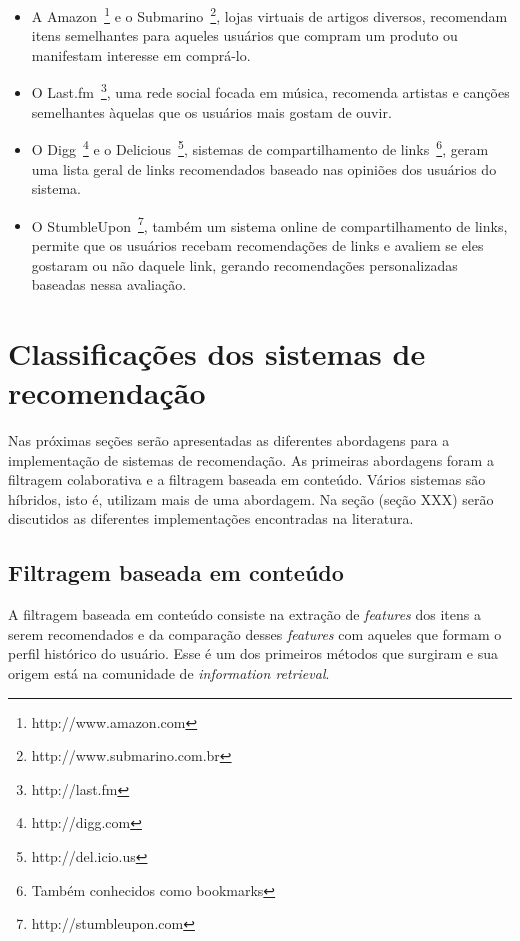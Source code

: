 \begin{itemize}
\item 
A Amazon~\footnote{http://www.amazon.com} e o Submarino~\footnote{http://www.submarino.com.br}, lojas virtuais de artigos diversos, recomendam itens semelhantes para aqueles usuários que compram um produto ou manifestam interesse em comprá-lo.

\item O Last.fm~\footnote{http://last.fm}, uma rede social focada em música, recomenda artistas e canções semelhantes àquelas que os usuários mais gostam de ouvir.

\item O Digg~\footnote{http://digg.com} e o Delicious~\footnote{http://del.icio.us}, sistemas de compartilhamento de links~\footnote{Também conhecidos como bookmarks}, geram uma lista geral de links recomendados baseado nas opiniões dos usuários do sistema.

\item O StumbleUpon~\footnote{http://stumbleupon.com}, também um sistema online de compartilhamento de links, permite que os usuários recebam recomendações de links e avaliem se eles gostaram ou não daquele link, gerando recomendações personalizadas baseadas nessa avaliação.
\end{itemize}


\section{Classificações dos sistemas de recomendação}

Nas próximas seções serão apresentadas as diferentes abordagens para a implementação de sistemas de recomendação. As primeiras abordagens foram a filtragem colaborativa e a filtragem baseada em conteúdo. Vários sistemas são híbridos, isto é, utilizam mais de uma abordagem. Na seção (seção XXX) serão discutidos as diferentes implementações encontradas na literatura.

\subsection{Filtragem baseada em conteúdo} %
A filtragem baseada em conteúdo consiste na extração de \textit{features} dos itens a serem recomendados e da comparação desses \textit{features} com aqueles que formam o  perfil histórico do usuário. Esse é um dos primeiros métodos que surgiram e sua origem está na comunidade de \textit{information retrieval}.~\cite{Balabanovi97}

